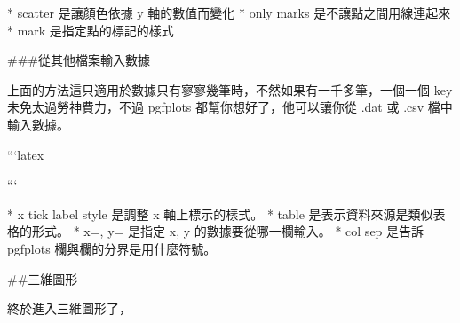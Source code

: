 \begin{markdown}
* scatter 是讓顏色依據 y 軸的數值而變化
* only marks 是不讓點之間用線連起來
* mark 是指定點的標記的樣式

###從其他檔案輸入數據

上面的方法這只適用於數據只有寥寥幾筆時，不然如果有一千多筆，一個一個 key 未免太過勞神費力，不過 pgfplots 都幫你想好了，他可以讓你從 .dat 或 .csv 檔中輸入數據。

```latex
```

* x tick label style 是調整 x 軸上標示的樣式。
* table 是表示資料來源是類似表格的形式。
* x=, y= 是指定 x, y 的數據要從哪一欄輸入。
* col sep 是告訴 pgfplots 欄與欄的分界是用什麼符號。

##三維圖形

終於進入三維圖形了，

\end{markdown}